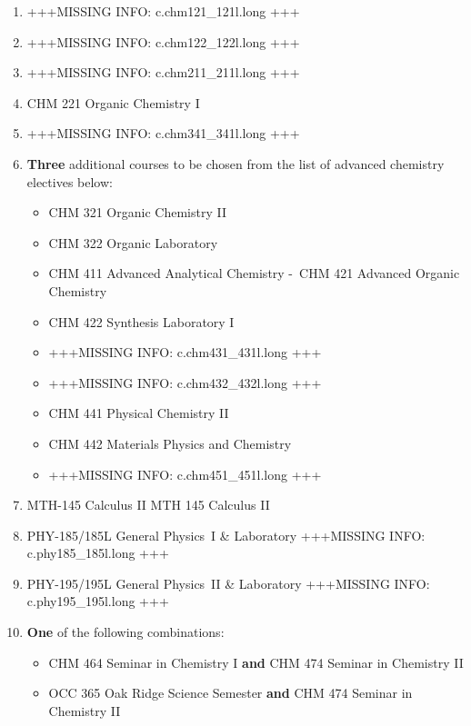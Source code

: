 \documentclass[
  letterpaper,
]{scrbook}
\providecommand{\tightlist}{%
  \setlength{\itemsep}{0pt}\setlength{\parskip}{0pt}}
\begin{document}
\begin{enumerate}
\def\labelenumi{\arabic{enumi}.}
\item
  +++MISSING INFO: c.chm121\_121l.long +++
\item
  +++MISSING INFO: c.chm122\_122l.long +++
\item
  +++MISSING INFO: c.chm211\_211l.long +++
\item
  CHM 221 Organic Chemistry I
\item
  +++MISSING INFO: c.chm341\_341l.long +++
\item
  \textbf{Three} additional courses to be chosen from the list of
  advanced chemistry electives below:

  \begin{itemize}
  \tightlist
  \item
    CHM 321 Organic Chemistry II
  \item
    CHM 322 Organic Laboratory
  \item
    CHM 411 Advanced Analytical Chemistry -~CHM 421 Advanced Organic
    Chemistry
  \item
    CHM 422 Synthesis Laboratory I
  \item
    +++MISSING INFO: c.chm431\_431l.long +++
  \item
    +++MISSING INFO: c.chm432\_432l.long +++
  \item
    CHM 441 Physical Chemistry II
  \item
    CHM 442 Materials Physics and Chemistry
  \item
    +++MISSING INFO: c.chm451\_451l.long +++
  \end{itemize}
\item
  MTH-145 Calculus II MTH 145 Calculus II
\item
  PHY-185/185L General Physics~I \& Laboratory +++MISSING INFO:
  c.phy185\_185l.long +++
\item
  PHY-195/195L General Physics~II \& Laboratory +++MISSING INFO:
  c.phy195\_195l.long +++
\item
  \textbf{One} of the following combinations:

  \begin{itemize}
  \tightlist
  \item
    CHM 464 Seminar in Chemistry I \textbf{and} CHM 474 Seminar in
    Chemistry II
  \item
    OCC 365 Oak Ridge Science Semester \textbf{and} CHM 474 Seminar in
    Chemistry II
  \end{itemize}
\end{enumerate}
\end{document}
